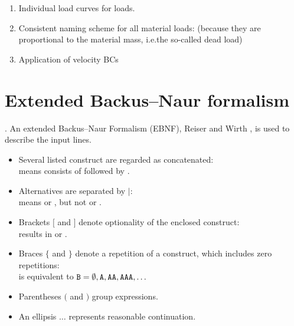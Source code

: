 \begin{enumerate}
\item Individual load curves for loads.
\item Consistent naming scheme for all material loads:  (because they
  are proportional to the material mass, i.e.\@ the so-called dead load)
\item Application of velocity BCs
\end{enumerate}


\section{Extended Backus--Naur formalism}\label{wall1:sec:ebnf}.
An extended Backus--Naur Formalism (EBNF), Reiser and Wirth
, is used to describe the input lines.

\begin{itemize}
\item Several listed construct are regarded as concatenated:\\
   means  consists of  followed by .
\item Alternatives are separated by $|$:\\
   means  or , but not 
   or \@. 
\item Brackets $[$ and $]$ denote optionality of the enclosed 
  construct:\\
   results in  or \@.
\item Braces $\{$ and $\}$ denote a repetition of a construct, 
  which includes zero repetitions:\\
   is equivalent to $\texttt{\textup{B}} = \emptyset, \texttt{\textup{A}}, \texttt{\textup{AA}}, \texttt{\textup{AAA}}, \ldots$
\item Parentheses $($ and $)$ group expressions.
\item An ellipsis $\ldots$ represents reasonable continuation.
\end{itemize}